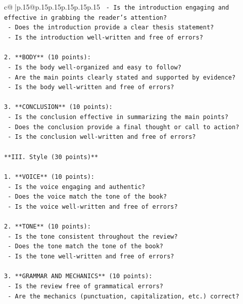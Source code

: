 \documentclass{article}
\begin{document}
{\begin{supertabular}{c@{$\;$}|p{.15\linewidth}@{}p{.15\linewidth}p{.15\linewidth}p{.15\linewidth}p{.15\linewidth}p{.15\linewidth}}
{{{\texttt{   {-} Is the introduction engaging and effective in grabbing the reader's attention?} \\
\texttt{   {-} Does the introduction provide a clear thesis statement?} \\
\texttt{   {-} Is the introduction well{-}written and free of errors?} \\
\\ 
\texttt{2. **BODY** (10 points):} \\
\texttt{   {-} Is the body well{-}organized and easy to follow?} \\
\texttt{   {-} Are the main points clearly stated and supported by evidence?} \\
\texttt{   {-} Is the body well{-}written and free of errors?} \\
\\ 
\texttt{3. **CONCLUSION** (10 points):} \\
\texttt{   {-} Is the conclusion effective in summarizing the main points?} \\
\texttt{   {-} Does the conclusion provide a final thought or call to action?} \\
\texttt{   {-} Is the conclusion well{-}written and free of errors?} \\
\\ 
\texttt{**III. Style (30 points)**} \\
\\ 
\texttt{1. **VOICE** (10 points):} \\
\texttt{   {-} Is the voice engaging and authentic?} \\
\texttt{   {-} Does the voice match the tone of the book?} \\
\texttt{   {-} Is the voice well{-}written and free of errors?} \\
\\ 
\texttt{2. **TONE** (10 points):} \\
\texttt{   {-} Is the tone consistent throughout the review?} \\
\texttt{   {-} Does the tone match the tone of the book?} \\
\texttt{   {-} Is the tone well{-}written and free of errors?} \\
\\ 
\texttt{3. **GRAMMAR AND MECHANICS** (10 points):} \\
\texttt{   {-} Is the review free of grammatical errors?} \\
\texttt{   {-} Are the mechanics (punctuation, capitalization, etc.) correct?} \\
}}}
\end{supertabular}}
\end{document}
